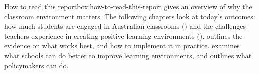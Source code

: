 \documentclass{grattan}
\begin{document}

\begin{addsmallbox}{How to read this report}{box:how-to-read-this-report}
 gives an overview of why the classroom environment matters.
The following chapters look at today's outcomes: how much students are engaged in Australian classrooms () and the challenges teachers experience in creating positive learning environments ().  outlines the evidence on what works best, and how to implement it in practice.  examines what schools can do better to improve learning environments, and  outlines what policymakers can do.
\end{addsmallbox}
\end{document}

